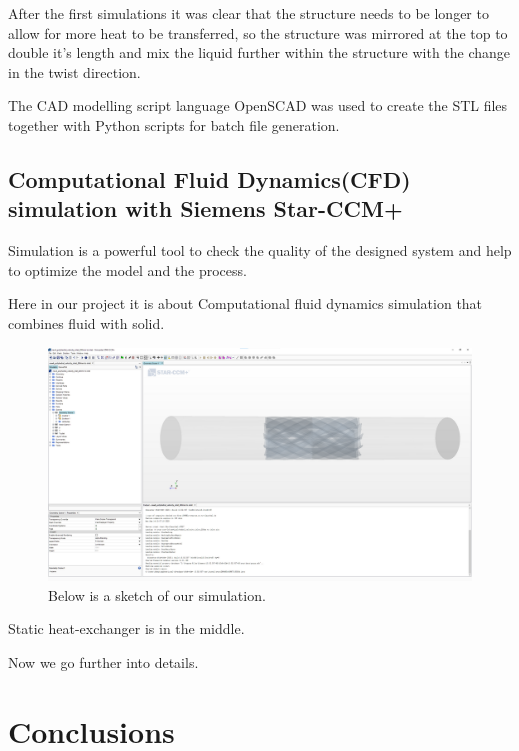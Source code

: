 \documentclass[journal,article,submit,moreauthors,pdftex]{Definitions/mdpi}
\begin{document}
After the first simulations it was clear that the structure needs to be longer to allow for more heat to be transferred, so the structure was mirrored at the top to double it's length and mix the liquid further within the structure with the change in the twist direction.

The CAD modelling script language OpenSCAD \cite{openscad} was used to create the STL files together with Python \cite{python} scripts for batch file generation.

\subsection{Computational Fluid Dynamics(CFD) simulation with Siemens Star-CCM+}
Simulation is a powerful tool to check the quality of the designed system and help to optimize the model and the process. 

Here in our project it is about Computational fluid dynamics simulation that combines fluid with solid. 

\begin{figure}
\begin{center}
\centerline{\includegraphics[width=\textwidth]{./docu_pictures/sketch.png}}
\end{center}
\caption{Below is a sketch of our simulation.}
\label{simulation-sketch}
\end{figure}

Static heat-exchanger is in the middle. 

Now we go further into details.


\section{Conclusions}
\end{document}
